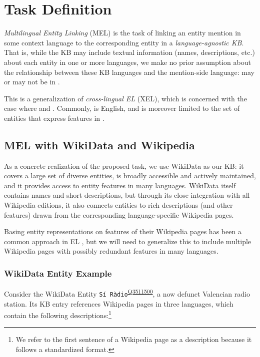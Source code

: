 \documentclass[11pt,a4paper]{article}
\newcommand{\entity}[1]{\texttt{#1}}
\newcommand{\ientity}[2]{\entity{#1}\textsuperscript{\href{https://www.wikidata.org/wiki/#2}{#2}}}
\begin{document}
\section{Task Definition}
\emph{Multilingual Entity Linking} (MEL) is the task of linking an entity mention  in
some context language  to the corresponding entity  in a \emph{language-agnostic KB}. That is, while the KB may include textual information (names, descriptions, etc.) about each entity in one or more languages, we make no prior assumption about the relationship between these KB languages  and the mention-side language:  may or may not be in .

This is a generalization of \emph{cross-lingual EL} (XEL), which is concerned with the case 
where  and .
Commonly,  is English, and  is moreover limited to the set of entities that express features in .

\subsection{MEL with WikiData and Wikipedia}
As a concrete realization of the proposed task, we use WikiData \cite{vrandevcic2014wikidata} as our KB:
it covers a large set of diverse entities,
is broadly accessible and actively maintained,
and it provides access to entity features in many languages.
WikiData itself contains names and short descriptions,
but through its close integration with all Wikipedia editions,
it also connects entities to rich descriptions (and other features) drawn from the corresponding language-specific Wikipedia pages.

Basing entity representations on features of their Wikipedia pages has been a common approach 
in EL \cite[e.g.][]{sil-florian-2016-one,francis-landau-etal-2016-capturing,gillick-etal-2019-learning,wu2019zeroshot}, but we will need to generalize this to include multiple Wikipedia pages with possibly redundant features in many languages.

\subsubsection{WikiData Entity Example}\label{sec:description_example}
Consider the WikiData Entity \ientity{Sí Ràdio}{Q3511500}, a now defunct Valencian radio station. Its KB entry references Wikipedia pages in three languages, which contain the following descriptions:\footnote{We refer to the first sentence of a Wikipedia page as a description because it follows a standardized format.}
\end{document}
